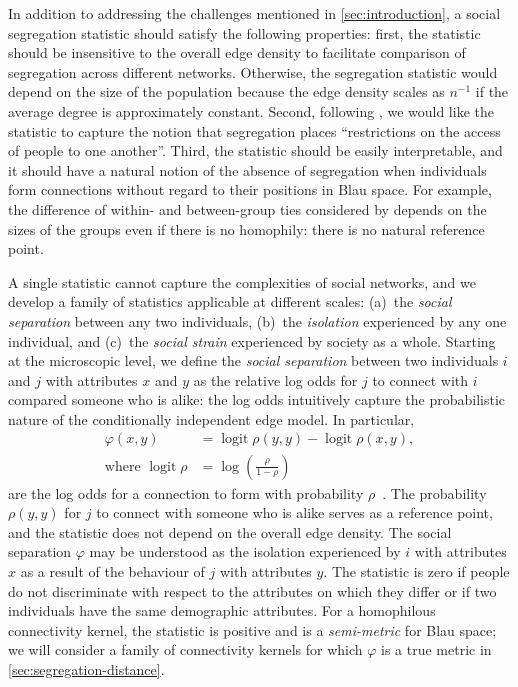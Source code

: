 \documentclass{scrartcl}
\DeclareMathOperator{\logit}{logit}
\begin{document}
In addition to addressing the challenges mentioned in \cref{sec:introduction}, a social segregation statistic should satisfy the following properties: first, the statistic should be insensitive to the overall edge density to facilitate comparison of segregation across different networks. Otherwise, the segregation statistic would depend on the size of the population because the edge density scales as $n^{-1}$ if the average degree is approximately constant. Second, following \textcite{Freeman1978}, we would like the statistic to capture the notion that segregation places ``restrictions on the access of people to one another''. Third, the statistic should be easily interpretable, and it should have a natural notion of the absence of segregation when individuals form connections without regard to their positions in Blau space. For example, the difference of within- and between-group ties considered by \textcite{Krackhardt1988} depends on the sizes of the groups even if there is no homophily: there is no natural reference point.

A single statistic cannot capture the complexities of social networks, and we develop a family of statistics applicable at different scales: (a)~the \emph{social separation} between any two individuals, (b)~the \emph{isolation} experienced by any one individual, and (c)~the \emph{social strain} experienced by society as a whole. Starting at the microscopic level, we define the \emph{social separation} between two individuals $i$ and $j$ with attributes $x$ and $y$ as the relative log odds for $j$ to connect with $i$ compared someone who is alike: the log odds intuitively capture the probabilistic nature of the conditionally independent edge model. In particular,
\begin{align}
    \varphi(x, y) &= \logit \rho(y,y) - \logit\rho(x,y),\label{eq:social-separation}\\
    \text{where }\logit\rho &= \log\left(\frac{\rho}{1-\rho}\right)\nonumber
\end{align}
are the log odds for a connection to form with probability $\rho$~\cite{Hastie2009}. The probability $\rho(y, y)$ for $j$ to connect with someone who is alike serves as a reference point, and the statistic does not depend on the overall edge density. The social separation $\varphi$ may be understood as the isolation experienced by $i$ with attributes $x$ as a result of the behaviour of $j$ with attributes $y$. The statistic is zero if people do not discriminate with respect to the attributes on which they differ or if two individuals have the same demographic attributes. For a homophilous connectivity kernel, the statistic is positive and is a \emph{semi-metric} for Blau space; we will consider a family of connectivity kernels for which $\varphi$ is a true metric in \cref{sec:segregation-distance}.
\end{document}

